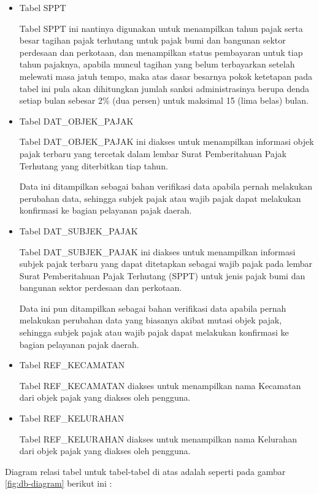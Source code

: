 \begin{itemize}
	\item Tabel SPPT
	
Tabel SPPT ini nantinya digunakan untuk menampilkan tahun pajak serta besar tagihan pajak terhutang untuk pajak bumi dan bangunan sektor perdesaan dan perkotaan, dan menampilkan status pembayaran untuk tiap tahun pajaknya, apabila muncul tagihan yang belum terbayarkan setelah melewati masa jatuh tempo, maka atas dasar besarnya pokok ketetapan pada tabel ini pula akan dihitungkan jumlah sanksi administrasinya berupa denda setiap bulan sebesar 2\% (dua persen) untuk maksimal 15 (lima belas) bulan.	
	
	\item Tabel DAT\_OBJEK\_PAJAK
	
Tabel DAT\_OBJEK\_PAJAK ini diakses untuk menampilkan informasi objek pajak terbaru yang tercetak dalam lembar Surat Pemberitahuan Pajak Terhutang yang diterbitkan tiap tahun. 

Data ini ditampilkan sebagai bahan verifikasi data apabila pernah melakukan perubahan data, sehingga subjek pajak atau wajib pajak dapat melakukan konfirmasi ke bagian pelayanan pajak daerah.	
	
	\item Tabel DAT\_SUBJEK\_PAJAK
	
Tabel DAT\_SUBJEK\_PAJAK ini diakses untuk menampilkan informasi subjek pajak terbaru yang dapat ditetapkan sebagai wajib pajak pada lembar Surat Pemberitahuan Pajak Terhutang (SPPT) untuk jenis pajak bumi dan bangunan sektor perdesaan dan perkotaan.

Data ini pun ditampilkan sebagai bahan verifikasi data apabila pernah melakukan perubahan data yang biasanya akibat mutasi objek pajak, sehingga subjek pajak atau wajib pajak dapat melakukan konfirmasi ke bagian pelayanan pajak daerah.	
	
	\item Tabel REF\_KECAMATAN
	
Tabel REF\_KECAMATAN diakses untuk menampilkan nama Kecamatan dari objek pajak yang diakses oleh pengguna.	
	
	\item Tabel REF\_KELURAHAN
	
Tabel REF\_KELURAHAN diakses untuk menampilkan nama Kelurahan dari objek pajak yang diakses oleh pengguna.	
	
\end{itemize}

Diagram relasi tabel untuk tabel-tabel di atas adalah seperti pada gambar \ref{fig:db-diagram} berikut ini :

